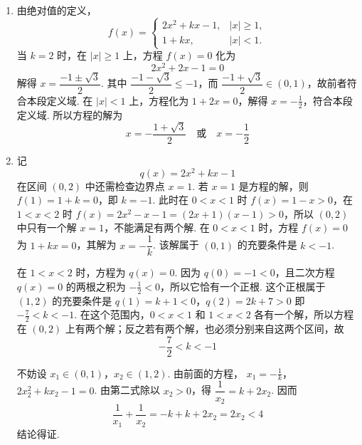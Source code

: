 \begin{solution}
\begin{enumerate}
\item 由绝对值的定义，
\[
f(x)=
\begin{cases}
2x^2+kx-1,& |x|\geqslant1,\\
1+kx,& |x|<1.
\end{cases}
\]
当 \(k=2\) 时，在 \(|x|\geqslant1\) 上，方程 \(f(x)=0\) 化为
\[
2x^2+2x-1=0
\]
解得 \(x=\dfrac{-1\pm\sqrt{3}}{2}\). 其中 \(\dfrac{-1-\sqrt{3}}{2}\leqslant-1\)，而 \(\dfrac{-1+\sqrt{3}}{2}\in(0,1)\)，故前者符合本段定义域.
在 \(|x|<1\) 上，方程化为 \(1+2x=0\)，解得 \(x=-\frac{1}{2}\)，符合本段定义域. 所以方程的解为
\[
x=-\frac{1+\sqrt{3}}{2}\quad\text{或}\quad x=-\frac{1}{2}
\]

\item 记
\[
q(x)=2x^2+kx-1
\]
在区间 \((0,2)\) 中还需检查边界点 \(x=1\). 若 \(x=1\) 是方程的解，则 \(f(1)=1+k=0\)，即 \(k=-1\). 此时在 \(0<x<1\) 时 \(f(x)=1-x>0\)，在 \(1<x<2\) 时 \(f(x)=2x^2-x-1=(2x+1)(x-1)>0\)，所以 \((0,2)\) 中只有一个解 \(x=1\)，不能满足有两个解.
在 \(0<x<1\) 时，方程 \(f(x)=0\) 为 \(1+kx=0\)，其解为 \(x=-\dfrac{1}{k}\). 该解属于 \((0,1)\) 的充要条件是 \(k<-1\).

在 \(1<x<2\) 时，方程为 \(q(x)=0\). 因为 \(q(0)=-1<0\)，且二次方程 \(q(x)=0\) 的两根之积为 \(-\frac{1}{2}<0\)，所以它恰有一个正根. 这个正根属于 \((1,2)\) 的充要条件是
\(q(1)=k+1<0\)，\(q(2)=2k+7>0\)
即 \(-\frac{7}{2}<k<-1\). 在这个范围内，\(0<x<1\) 和 \(1<x<2\) 各有一个解，所以方程在 \((0,2)\) 上有两个解；反之若有两个解，也必须分别来自这两个区间，故
\[
-\frac{7}{2}<k<-1
\]

不妨设 \(x_1\in(0,1)\)，\(x_2\in(1,2)\). 由前面的方程，
\(x_1=-\frac{1}{k}\)，\(2x_2^2+kx_2-1=0\).
由第二式除以 \(x_2>0\)，得 \(\dfrac{1}{x_2}=k+2x_2\). 因而
\[
\frac{1}{x_1}+\frac{1}{x_2}=-k+k+2x_2=2x_2<4
\]
结论得证.
\end{enumerate}
\end{solution}

